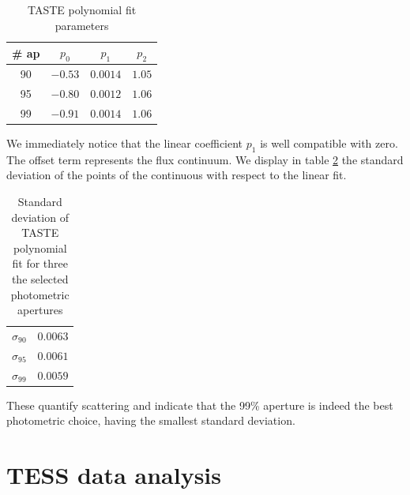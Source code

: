 \documentclass{aa}
\begin{document}
\begin{table}[h!]
\centering
    \begin{tabular}{cccc}
    \hline
    \# ap & $p_0$ & $p_1$ & $p_2$ \\
    \hline
    90 & $-0.53$ & $0.0014$  & $1.05$\\
    95 & $-0.80$ & $0.0012$  & $1.06$\\
    99 & $-0.91$ & $0.0014$  & $1.06$\\
    \hline
    \end{tabular}
\caption{TASTE polynomial fit parameters}
\label{table:d}
\end{table}
We immediately notice that the linear coefficient $p_1$ is well compatible with zero. The offset term represents the flux continuum.
We display in table \ref{table: f} the standard deviation of the points of the continuous with respect to the linear fit.
\begin{table}[h!]
   \centering
    \begin{tabular}{cc}
    \hline
    $\sigma_{90}$ & $0.0063$ \\
    $\sigma_{95}$ & $0.0061$ \\
    $\sigma_{99}$ & $0.0059$ \\
    \hline
    \end{tabular}
    \caption{Standard deviation of TASTE polynomial fit for three the selected photometric apertures}
\label{table: f}
\end{table}
These quantify scattering and indicate that the 99\% aperture is indeed the best photometric choice, having the smallest standard deviation.



\section{TESS data analysis}
\end{document}
